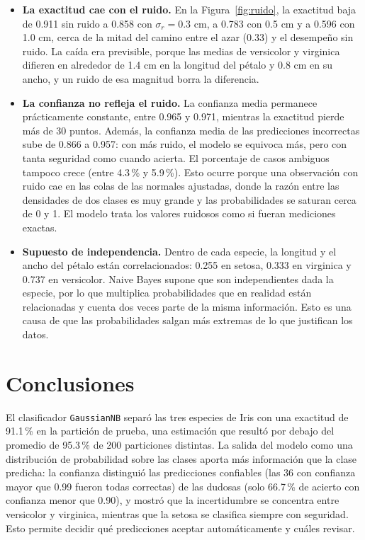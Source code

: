 \documentclass[11pt,letterpaper]{article}
\begin{document}
\begin{itemize}
    \item \textbf{La exactitud cae con el ruido.} En la Figura~\ref{fig:ruido}, la exactitud baja de 0.911 sin ruido a 0.858 con $\sigma_r = 0.3$ cm, a 0.783 con 0.5 cm y a 0.596 con 1.0 cm, cerca de la mitad del camino entre el azar (0.33) y el desempeño sin ruido. La caída era previsible, porque las medias de versicolor y virginica difieren en alrededor de 1.4 cm en la longitud del pétalo y 0.8 cm en su ancho, y un ruido de esa magnitud borra la diferencia.
    \item \textbf{La confianza no refleja el ruido.} La confianza media permanece prácticamente constante, entre 0.965 y 0.971, mientras la exactitud pierde más de 30 puntos. Además, la confianza media de las predicciones incorrectas sube de 0.866 a 0.957: con más ruido, el modelo se equivoca más, pero con tanta seguridad como cuando acierta. El porcentaje de casos ambiguos tampoco crece (entre 4.3\,\% y 5.9\,\%). Esto ocurre porque una observación con ruido cae en las colas de las normales ajustadas, donde la razón entre las densidades de dos clases es muy grande y las probabilidades se saturan cerca de 0 y 1. El modelo trata los valores ruidosos como si fueran mediciones exactas.
    \item \textbf{Supuesto de independencia.} Dentro de cada especie, la longitud y el ancho del pétalo están correlacionados: 0.255 en setosa, 0.333 en virginica y 0.737 en versicolor. Naive Bayes supone que son independientes dada la especie, por lo que multiplica probabilidades que en realidad están relacionadas y cuenta dos veces parte de la misma información. Esto es una causa de que las probabilidades salgan más extremas de lo que justifican los datos.
\end{itemize}

\section{Conclusiones}

El clasificador \texttt{GaussianNB} separó las tres especies de Iris con una exactitud de 91.1\,\% en la partición de prueba, una estimación que resultó por debajo del promedio de 95.3\,\% de 200 particiones distintas. La salida del modelo como una distribución de probabilidad sobre las clases aporta más información que la clase predicha: la confianza distinguió las predicciones confiables (las 36 con confianza mayor que 0.99 fueron todas correctas) de las dudosas (solo 66.7\,\% de acierto con confianza menor que 0.90), y mostró que la incertidumbre se concentra entre versicolor y virginica, mientras que la setosa se clasifica siempre con seguridad. Esto permite decidir qué predicciones aceptar automáticamente y cuáles revisar.
\end{document}
